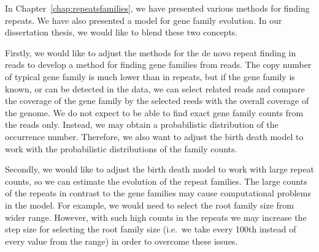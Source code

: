 In Chapter~\ref{chap:repeatsfamilies}, we have presented various methods for finding repeats. We have also presented a model for gene family evolution.
In our dissertation thesis, we would like to blend these two concepts.

Firstly, we would like to adjust the methods for the de novo repeat finding in reads to develop a method for finding gene families from reads.
The copy number of typical gene family is much lower than in repeats, but if the gene family is known, or can be detected in the data, we can select related reads and compare the coverage of the gene family by the selected reeds with the overall coverage of the genome.
We do not expect to be able to find exact gene family counts from the reads only.
Instead, we may obtain a probabilistic distribution of the occurrence number.
Therefore, we also want to adjust the birth death model to work with the probabilistic distributions of the family counts.

Secondly, we would like to adjust the birth death model to work with large repeat counts, so we can estimate the evolution of the repeat families. The large counts of the repeats in contrast to the gene families may cause computational problems in the model. For example, we would need to select the root family size from wider range.
However, with such high counts in the repeats we may increase the step size for selecting the root family size (i.e.\ we take every 100th instead of every value from the range) in order to overcome these issues.
